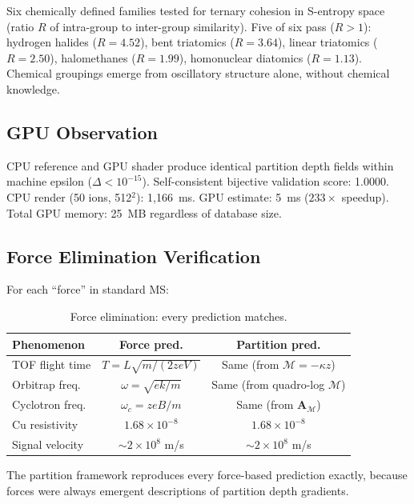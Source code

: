 \documentclass[11pt,twocolumn,a4paper]{article}
\theoremstyle{definition}
\theoremstyle{remark}
\newcommand{\Depth}{\mathcal{M}}
\newcommand{\Apartition}{\mathbf{A}_{\mathcal{M}}}
\begin{document}
Six chemically defined families tested for ternary cohesion in S-entropy space (ratio $R$ of intra-group to inter-group similarity). Five of six pass ($R > 1$): hydrogen halides ($R = 4.52$), bent triatomics ($R = 3.64$), linear triatomics ($R = 2.50$), halomethanes ($R = 1.99$), homonuclear diatomics ($R = 1.13$). Chemical groupings emerge from oscillatory structure alone, without chemical knowledge.

\subsection{GPU Observation}

CPU reference and GPU shader produce identical partition depth fields within machine epsilon ($\Delta < 10^{-15}$). Self-consistent bijective validation score: 1.0000. CPU render (50 ions, 512$^2$): 1,166~ms. GPU estimate: 5~ms ($233\times$ speedup). Total GPU memory: 25~MB regardless of database size.

\subsection{Force Elimination Verification}

For each ``force'' in standard MS:

\begin{table}[H]
\centering
\caption{Force elimination: every prediction matches.}
\small
\begin{tabular}{lcc}
\toprule
\textbf{Phenomenon} & \textbf{Force pred.} & \textbf{Partition pred.} \\
\midrule
TOF flight time & $T = L\sqrt{m/(2zeV)}$ & Same (from $\Depth = -\kappa z$) \\
Orbitrap freq. & $\omega = \sqrt{ek/m}$ & Same (from quadro-log $\Depth$) \\
Cyclotron freq. & $\omega_c = zeB/m$ & Same (from $\Apartition$) \\
Cu resistivity & $1.68\times 10^{-8}$ & $1.68\times 10^{-8}$ \\
Signal velocity & $\sim 2\times 10^8$ m/s & $\sim 2\times 10^8$ m/s \\
\bottomrule
\end{tabular}
\end{table}

The partition framework reproduces every force-based prediction exactly, because forces were always emergent descriptions of partition depth gradients.
\end{document}
